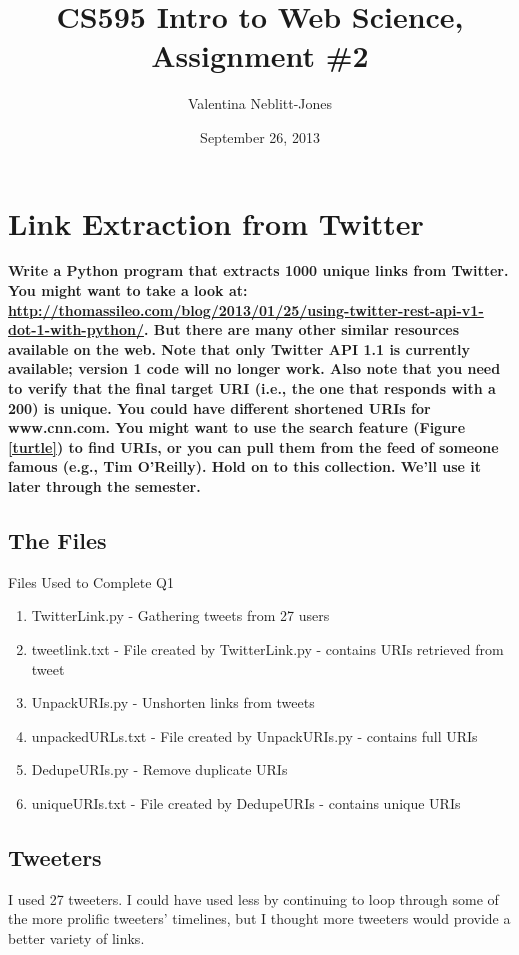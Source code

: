 \documentclass{article}
\begin{document}
\title{CS595 Intro to Web Science, Assignment \#2}
\author{Valentina Neblitt-Jones}
\date{September 26, 2013}
\maketitle

\section{Link Extraction from Twitter}
\textbf {Write a Python program that extracts 1000 unique links from Twitter. You might want to take a look at: \url{http://thomassileo.com/blog/2013/01/25/using-twitter-rest-api-v1-dot-1-with-python/}. But there are many other similar resources available on the web. Note that only Twitter API 1.1 is currently available; version 1 code will no longer work. Also note that you need to verify that the final target URI (i.e., the one that responds with a 200) is unique. You could have different shortened URIs for www.cnn.com. You might want to use the search feature (Figure \ref{turtle}) to find URIs, or you can pull them from the feed of someone famous (e.g., Tim O'Reilly). Hold on to this collection. We'll use it later through the semester.}


\subsection*{The Files}
Files Used to Complete Q1

\begin{enumerate}
\item TwitterLink.py - Gathering tweets from 27 users
\item tweetlink.txt - File created by TwitterLink.py - contains URIs retrieved from tweet
\item UnpackURIs.py - Unshorten links from tweets
\item unpackedURLs.txt - File created by UnpackURIs.py - contains full URIs
\item DedupeURIs.py - Remove duplicate URIs
\item uniqueURIs.txt - File created by DedupeURIs - contains unique URIs
\end{enumerate}

\subsection*{Tweeters}
I used 27 tweeters. I could have used less by continuing to loop through some of the more prolific tweeters' timelines, but I thought more tweeters would provide a better variety of links.
\end{document}

